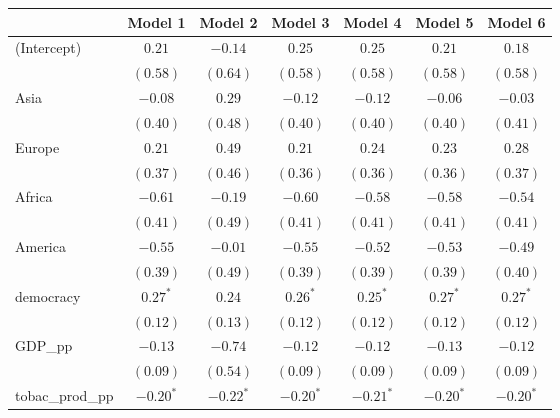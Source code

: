 
\begin{table}[!h]
\begin{center}
\begin{tabular}{l c c c c c c }
\toprule
 & Model 1 & Model 2 & Model 3 & Model 4 & Model 5 & Model 6 \\
\midrule
(Intercept)             & $0.21$       & $-0.14$      & $0.25$       & $0.25$       & $0.21$       & $0.18$       \\
                        & $(0.58)$     & $(0.64)$     & $(0.58)$     & $(0.58)$     & $(0.58)$     & $(0.58)$     \\
Asia                    & $-0.08$      & $0.29$       & $-0.12$      & $-0.12$      & $-0.06$      & $-0.03$      \\
                        & $(0.40)$     & $(0.48)$     & $(0.40)$     & $(0.40)$     & $(0.40)$     & $(0.41)$     \\
Europe                  & $0.21$       & $0.49$       & $0.21$       & $0.24$       & $0.23$       & $0.28$       \\
                        & $(0.37)$     & $(0.46)$     & $(0.36)$     & $(0.36)$     & $(0.36)$     & $(0.37)$     \\
Africa                  & $-0.61$      & $-0.19$      & $-0.60$      & $-0.58$      & $-0.58$      & $-0.54$      \\
                        & $(0.41)$     & $(0.49)$     & $(0.41)$     & $(0.41)$     & $(0.41)$     & $(0.41)$     \\
America                 & $-0.55$      & $-0.01$      & $-0.55$      & $-0.52$      & $-0.53$      & $-0.49$      \\
                        & $(0.39)$     & $(0.49)$     & $(0.39)$     & $(0.39)$     & $(0.39)$     & $(0.40)$     \\
democracy               & $0.27^{*}$   & $0.24$       & $0.26^{*}$   & $0.25^{*}$   & $0.27^{*}$   & $0.27^{*}$   \\
                        & $(0.12)$     & $(0.13)$     & $(0.12)$     & $(0.12)$     & $(0.12)$     & $(0.12)$     \\
GDP\_pp                 & $-0.13$      & $-0.74$      & $-0.12$      & $-0.12$      & $-0.13$      & $-0.12$      \\
                        & $(0.09)$     & $(0.54)$     & $(0.09)$     & $(0.09)$     & $(0.09)$     & $(0.09)$     \\
tobac\_prod\_pp         & $-0.20^{*}$  & $-0.22^{*}$  & $-0.20^{*}$  & $-0.21^{*}$  & $-0.20^{*}$  & $-0.20^{*}$  \\

\end{tabular}
\end{center}
\end{table}
